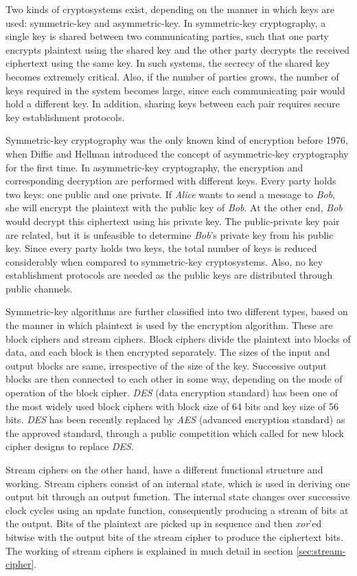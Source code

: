 Two kinds of cryptosystems exist, depending on the manner in which keys are used: symmetric-key and asymmetric-key. In symmetric-key cryptography, a single key is shared between two communicating parties, such that one party encrypts plaintext using the shared key and the other party decrypts the received ciphertext using the same key. In such systems, the secrecy of the shared key becomes extremely critical. Also, if the number of parties grows, the number of keys required in the system becomes large, since each communicating pair would hold a different key. In addition, sharing keys between each pair requires secure key establishment protocols. 

Symmetric-key cryptography was the only known kind of encryption before 1976, when Diffie and Hellman introduced the concept of asymmetric-key cryptography \cite{diffie1976ndc} for the first time. In asymmetric-key cryptography, the encryption and corresponding decryption are performed with different keys. Every party holds two keys: one public and one private. If \emph{Alice} wants to send a message to \emph{Bob}, she will encrypt the plaintext with the public key of \emph{Bob}. At the other end, \emph{Bob} would decrypt this ciphertext using his private key. The public-private key pair are related, but it is unfeasible to determine \emph{Bob}'s private key from his public key. Since every party holds two keys, the total number of keys is reduced considerably when compared to symmetric-key cryptosystems. Also, no key establishment protocols are needed as the public keys are distributed through public channels.

Symmetric-key algorithms are further classified into two different types, based on the manner in which plaintext is used by the encryption algorithm. These are block ciphers and stream ciphers. Block ciphers divide the plaintext into blocks of data, and each block is then encrypted separately. The sizes of the input and output blocks are same, irrespective of the size of the key. Successive output blocks are then connected to each other in some way, depending on the mode of operation of the block cipher. \emph{DES} (data encryption standard) has been one of the most widely used block ciphers with block size of 64 bits and key size of 56 bits. \emph{DES} has been recently replaced by \emph{AES} (advanced encryption standard) as the approved standard, through a public competition which called for new block cipher designs to replace \emph{DES}.

Stream ciphers on the other hand, have a different functional structure and working. Stream ciphers consist of an internal state, which is used in deriving one output bit through an output function. The internal state changes over successive clock cycles using an update function, consequently producing a stream of bits at the output. Bits of the plaintext are picked up in sequence and then \emph{xor}'ed bitwise with the output bits of the stream cipher to produce the ciphertext bits. The working of stream ciphers is explained in much detail in section \ref{sec:stream-cipher}. 

